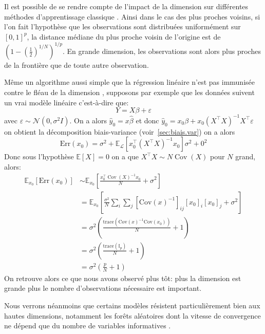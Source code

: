 Il est possible de se rendre compte de l'impact de la dimension sur différentes méthodes d'apprentissage classique \citep{Trevor}. Ainsi dans le cas des plus proches voisins, si l'on fait l'hypothèse que les observations sont distribuées uniformément sur $[0,1]^p$, la distance médiane du plus proche voisin de l'origine est de $\left( 1 - \left( \frac{1}{2} \right)^{1/N} \right)^{1/p}$. En grande dimension, les observations sont alors plus proches de la frontière que de toute autre observation.

Même un algorithme aussi simple que la régression linéaire n'est pas immunisée contre le fléau de la dimension \citep{Trevor}, supposons par exemple que les données suivent un vrai modèle linéaire c'est-à-dire que:
\begin{equation*}
    Y = X \beta + \varepsilon
\end{equation*} 
avec $\varepsilon \sim \mathcal{N}(0,\sigma^2 I)$. On a alors $\hat{y}_0 = x \hat{\beta}$ et donc $\hat{y}_0 = x_0 \beta +  x_0 ( X^\intercal X )^{-1} X^\intercal \varepsilon $ on obtient la décomposition biais-variance (voir~\ref{sec:biais.var}) on a alors
\begin{equation*}
    \mathrm{Err} (x_0) = \sigma^2 + \mathbb{E}_{\mathcal{L}} \left[ x_0^\intercal \left( X^\intercal X \right)^{-1} x_0  \right] \sigma^2 + 0^2
\end{equation*}
Donc sous l'hypothèse $\mathbb{E} [X] = 0$ on a que $X^\intercal X \sim N \operatorname{Cov} (X)$ pour $N$ grand, alors:
\begin{align*}
    \mathbb{E}_{x_0} \left[ \mathrm{Err} (x_0) \right] &\sim \mathbb{E}_{x_0} \left[ \frac{x_0^\intercal \operatorname{Cov} (X)^{-1} x_0}{N} + \sigma^2 \right] \\
    &= \mathbb{E}_{x_0} \left[ \frac{\sigma^2}{N} \sum_i \sum_j \left[ \mathrm{Cov} (x)^{-1} \right]_{ij} \left[ x_0 \right]_i \left[ x_0 \right]_j + \sigma^2 \right] \\
    &= \sigma^2 \left( \frac{\mathrm{trace} \left( \mathrm{Cov} (x)^{-1} \mathrm{Cov} (x_0) \right)}{N} +1 \right) \\
    &= \sigma^2 \left( \frac{\mathrm{trace} \left( \mathbb{I}_p \right)}{N} +1 \right) \\
    &= \sigma^2 \left( \frac{p}{N} + 1 \right)
\end{align*}
On retrouve alors ce que nous avons observé plus tôt: plus la dimension est grande plus le nombre d'observations nécessaire est important.

Nous verrons néanmoins que certains modèles résistent particulièrement bien aux hautes dimensions, notamment les forêts aléatoires dont la vitesse de convergence ne dépend que du nombre de variables informatives \citep{Biau2010a,Breiman2004a}.

